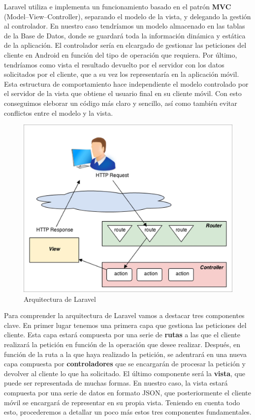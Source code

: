 Laravel utiliza e implementa un funcionamiento basado en el patrón \textbf{MVC} (Model–View–Controller), separando el modelo de la vista, y delegando la gestión al controlador. En nuestro caso tendríamos un modelo almacenado en las tablas de la Base de Datos, donde se guardará toda la información dinámica y estática de la aplicación. El controlador sería en elcargado de gestionar las peticiones del cliente en Android en función del tipo de operación que requiera. Por último, tendríamos como vista el resultado devuelto por el servidor con los datos solicitados por el cliente, que a su vez los representaría en la aplicación móvil. Esta estructura de comportamiento hace independiente el modelo controlado por el servidor de la vista que obtiene el usuario final en su cliente móvil. Con esto conseguimos eleborar un código más claro y sencillo, así como también evitar conflictos entre el modelo y la vista.

\begin{figure}[H]
\centering
\includegraphics[keepaspectratio, scale=0.8]{Media/Captures/laravelArch.jpg}
\caption{Arquitectura de Laravel}
\label{fig:laravelArch}
\end{figure}

Para comprender la arquitectura de Laravel vamos a destacar tres componentes clave. En primer lugar tenemos una primera capa que gestiona las peticiones del cliente. Esta capa estará compuesta por una serie de \textbf{rutas} a las que el cliente realizará la petición en función de la operación que desee realizar. Después, en función de la ruta a la que haya realizado la petición, se adentrará en una nueva capa compuesta por \textbf{controladores} que se encargarán de procesar la petición y devolver al cliente lo que ha solicitado. El último componente será la \textbf{vista}, que puede ser representada de muchas formas. En nuestro caso, la vista estará compuesta por una serie de datos en formato JSON, que posteriormente el cliente móvil se encargará de representar en su propia vista. Teniendo en cuenta todo esto, procederemos a detallar un poco más estos tres componentes fundamentales.

